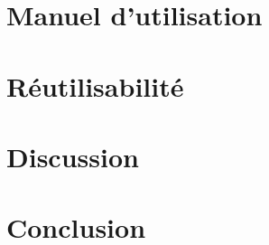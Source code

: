 \documentclass[a4paper,11pt]{report}
\begin{document}
	
	
		
		
		
\chapter{Manuel d'utilisation}

	

\chapter{Réutilisabilité}

	

\chapter{Discussion}

	

	
\chapter{Conclusion}

	

\printglossaries
\end{document}
